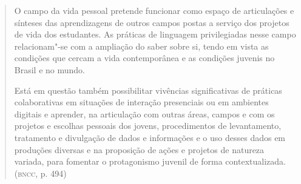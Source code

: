 \documentclass[12pt]{extarticle}
\begin{document}
\begin{quote}
O campo da vida pessoal pretende funcionar como espaço de articulações
e sínteses das aprendizagens de outros campos postas a serviço dos
projetos de vida dos estudantes. As práticas de linguagem privilegiadas
nesse campo relacionam"-se com a ampliação do saber sobre si, tendo em
vista as condições que cercam a vida contemporânea e as condições
juvenis no Brasil e no mundo.

Está em questão também possibilitar vivências significativas de práticas
colaborativas em situações de interação presenciais ou em ambientes
digitais e aprender, na articulação com outras áreas, campos e com os
projetos e escolhas pessoais dos jovens, procedimentos de levantamento,
tratamento e divulgação de dados e informações e o uso desses dados em
produções diversas e na proposição de ações e projetos de natureza
variada, para fomentar o protagonismo juvenil de forma
contextualizada. (\textsc{bncc}, p. 494)
\end{quote}
\end{document}
